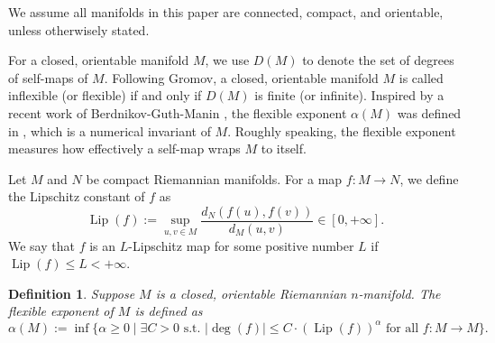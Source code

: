 \documentclass{amsart}
\newcommand{\ra}{\rightarrow}
\newcommand{\lip}{\operatorname{Lip}}
\newtheorem{defn}[thm]{Definition}
\begin{document}
We assume all manifolds in this paper are connected, compact, and orientable, unless otherwisely stated.

For a closed, orientable manifold $M$, we use $D(M)$ to denote the set of degrees of self-maps of $M$. Following Gromov, a closed, orientable manifold $M$ is called inflexible (or flexible) if and only if $D(M)$ is finite (or infinite). 
Inspired by a recent work of Berdnikov-Guth-Manin \cite{BGM}, the flexible exponent $\alpha(M)$ was defined in \cite{DLWWW}, which is a numerical invariant of $M$. Roughly speaking, the flexible exponent measures how effectively a self-map wraps $M$ to itself.

Let $M$ and $N$ be compact Riemannian manifolds.
For a map $f:M\to N$, we define the Lipschitz constant of $f$ as
\[
    \lip (f):=\sup_{u,v\in M} \frac{d_N(f(u),f(v))}{d_M(u,v)}\in [0,+\infty].
\]
We say that $f$ is an $L$-Lipschitz map for some positive number $L$ if $\lip (f)\leqslant L<+\infty$.



\begin{defn}
    Suppose $M$ is a closed, orientable Riemannian $n$-manifold. The flexible exponent of $M$ is defined as %
 \[\alpha(M):=\inf\{\alpha\geq 0\mid \exists C>0 \text{ s.t. } |\operatorname{deg}(f)|\leq C\cdot (\operatorname{Lip}(f))^{\alpha} \text{ for all }f:M\to M\}.\]    %
    \end{defn}
\end{document}
